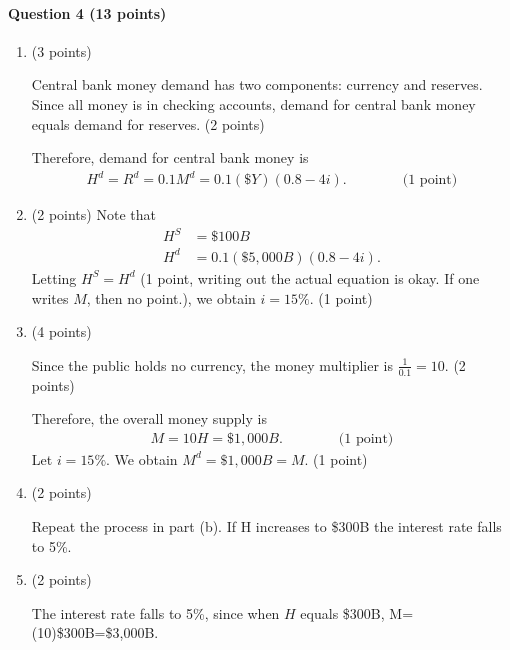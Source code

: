 \documentclass[12pt]{article}
\begin{document}
\paragraph{Question 4 (13 points)}
\begin{enumerate}[label=\alph*.]
	\item (3 points)
	
	Central bank money demand has two components: currency and reserves. Since all money is in checking accounts, demand for central bank money equals demand for reserves. (2 points)
	
	Therefore, demand for central bank money is
	\begin{align*}
		H^d = R^d = 0.1 M^d = 0.1 (\$ Y) (0.8 - 4i). \qquad\qquad \text{(1 point)}
	\end{align*}

	\item (2 points)
	Note that
	\begin{align*}
		H^S &= \$ 100 B\\
		H^d &= 0.1 (\$ 5,000 B) (0.8 - 4i).
	\end{align*}
	Letting $H^S = H^d$ (1 point, writing out the actual equation is okay. If one writes $M$, then no point.), we obtain $i = 15\%$. (1 point)

	\item (4 points)
	
	Since the public holds no currency, the money multiplier is $\frac{1}{0.1}=10$. (2 points)

	Therefore, the overall money supply is
	\begin{align*}
		M = 10 H = \$1,000 B. \qquad\qquad \text{(1 point)}
	\end{align*}
	Let $i=15\%$. We obtain $M^d = \$1,000 B = M$. (1 point)

	\item (2 points)
	
	Repeat the process in part (b). If H increases to \$300B the interest rate falls to 5\%.

	\item (2 points)
	
	The interest rate falls to 5\%, since when $H$ equals \$300B, M=(10)\$300B=\$3,000B.
\end{enumerate}
\end{document}
